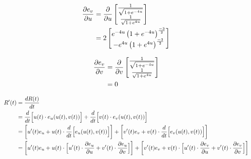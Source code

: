 \documentclass[a4paper, 11pt]{article}
\begin{document}
\begin{enumerate}[label=(\alph*)]
\begin{mdframed}
          \begin{minipage}[t]{0.5\textwidth}
            \begin{align*}
              \dfrac{\partial e_v}{\partial u} & = \dfrac{\partial}{\partial u}\begin{bmatrix}
                                    \frac{1}{\sqrt{1 + e^{-4u}}} \\
                                    \frac{1}{\sqrt{1 + e^{4u}}}
                                  \end{bmatrix}         \\
                        & =  2\begin{bmatrix}
                                e^{-4u}\left( 1+e^{-4u} \right)^{\frac{-3}2} \\
                                -e^{4u}\left( 1+e^{4u} \right)^{\frac{-3}2}
                              \end{bmatrix}
            \end{align*}
          \end{minipage}\begin{minipage}[t]{0.5\textwidth}
            \begin{align*}
              \dfrac{\partial e_v}{\partial v} & = \dfrac{\partial}{\partial v}\begin{bmatrix}
                                    \frac{1}{\sqrt{1 + e^{-4u}}} \\
                                    \frac{1}{\sqrt{1 + e^{4u}}}
                                  \end{bmatrix} \\
                        & = 0\end{align*}
          \end{minipage}









        \end{mdframed}
        \begin{align*}
          R'(t) & = \dfrac{dR(t)}{dt}                                                                                                                                                                                    \\
                & = \dfrac{d}{dt}\Big[u(t)\cdot e_u(u(t),v(t))  \Big] + \dfrac{d}{dt}\Big[ v(t)\cdot e_v(u(t),v(t)) \Big]                                                                                                       \\
                & = \left[ u'(t)e_u  +u(t)\cdot\dfrac{d}{dt}\Big[e_u(u(t),v(t))\Big] \right] + \left[   v'(t)e_v +v(t)\cdot\dfrac{d}{dt}\Big[e_v(u(t),v(t))\Big]\right]                                                         \\
                & = \left[ u'(t)e_u  +u(t)\cdot\Big[u'(t)\cdot \dfrac{\partial e_u}{\partial u} + v'(t)\cdot \dfrac{\partial e_u}{\partial v}\Big] \right] + \left[   v'(t)e_v +v(t)\cdot\Big[u'(t)\cdot \dfrac{\partial e_v}{\partial u} + v'(t)\cdot \dfrac{\partial e_v}{\partial v}\Big]\right] \\
        \end{align*}


\end{enumerate}
\end{document}
